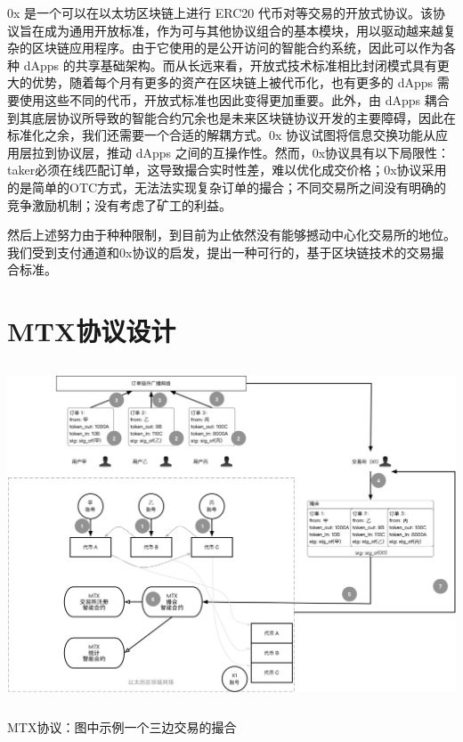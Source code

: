 \documentclass[UTF8,nofonts]{ctexart}
\makeatletter
\newenvironment{figurehere}
  {\def\@captype{figure}}
  {}
\makeatother
\begin{document}
0x \cite{warren20170x} 是一个可以在以太坊区块链上进行 ERC20 代币对等交易的开放式协议。该协议旨在成为通用开放标准，作为可与其他协议组合的基本模块，用以驱动越来越复杂的区块链应用程序。由于它使用的是公开访问的智能合约系统，因此可以作为各种 dApps 的共享基础架构。而从长远来看，开放式技术标准相比封闭模式具有更大的优势，随着每个月有更多的资产在区块链上被代币化，也有更多的 dApps 需要使用这些不同的代币，开放式标准也因此变得更加重要。此外，由 dApps 耦合到其底层协议所导致的智能合约冗余也是未来区块链协议开发的主要障碍，因此在标准化之余，我们还需要一个合适的解耦方式。0x 协议试图将信息交换功能从应用层拉到协议层，推动 dApps 之间的互操作性。然而，0x协议具有以下局限性：taker必须在线匹配订单，这导致撮合实时性差，难以优化成交价格；0x协议采用的是简单的OTC方式，无法法实现复杂订单的撮合；不同交易所之间没有明确的竞争激励机制；没有考虑了矿工的利益。

然后上述努力由于种种限制，到目前为止依然没有能够撼动中心化交易所的地位。我们受到支付通道和0x协议的启发，提出一种可行的，基于区块链技术的交易撮合标准。


\section{MTX协议设计\label{sec:protocol}}

\begin{center}
\begin{figurehere}
\includegraphics[height=10cm]{images/mtx-protocol.png}
\caption{MTX协议：图中示例一个三边交易的撮合}
\label{fig:mtxprotocol}
\end{figurehere}
\end{center}
\end{document}
